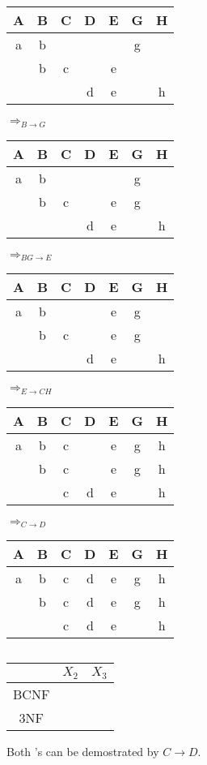 \subsection{}
\begin{center}
	\begin{tabular}{| c | c | c | c | c | c | c |}
		\hline
		A	&B	&C	&D	&E	&G	&H	\\\hline
		a	&b	&	&	&	&g	&	\\\hline
			&b	&c	&	&e	&	&	\\\hline
			&	&	&d	&e	&	&h	\\\hline
	\end{tabular}
	$\Longrightarrow_{B\rightarrow G}$
	\begin{tabular}{| c | c | c | c | c | c | c |}
		\hline
		A	&B	&C	&D	&E	&G	&H	\\\hline
		a	&b	&	&	&	&g	&	\\\hline
			&b	&c	&	&e	&g	&	\\\hline
			&	&	&d	&e	&	&h	\\\hline
	\end{tabular}
	$\Longrightarrow_{BG\rightarrow E}$
	\begin{tabular}{| c | c | c | c | c | c | c |}
		\hline
		A	&B	&C	&D	&E	&G	&H	\\\hline
		a	&b	&	&	&e	&g	&	\\\hline
			&b	&c	&	&e	&g	&	\\\hline
			&	&	&d	&e	&	&h	\\\hline
	\end{tabular}
	$\Longrightarrow_{E\rightarrow CH}$
	\begin{tabular}{| c | c | c | c | c | c | c |}
		\hline
		A	&B	&C	&D	&E	&G	&H	\\\hline
		a	&b	&c	&	&e	&g	&h	\\\hline
			&b	&c	&	&e	&g	&h	\\\hline
			&	&c	&d	&e	&	&h	\\\hline
	\end{tabular}
	$\Longrightarrow_{C\rightarrow D}$
	\begin{tabular}{| c | c | c | c | c | c | c |}
		\hline
		A	&B	&C	&D	&E	&G	&H	\\\hline
		a	&b	&c	&d	&e	&g	&h	\\\hline
			&b	&c	&d	&e	&g	&h	\\\hline
			&	&c	&d	&e	&	&h	\\\hline
	\end{tabular}
\end{center}

\subsection{}
\begin{center}
\begin{tabular}{| c | c | c |}
	\hline
			&$X_2$	&$X_3$	\\\hline
	BCNF	&\cmark	&\xmark	\\\hline
	3NF		&\cmark	&\xmark	\\\hline
\end{tabular}
\end{center}

Both \xmark 's can be demostrated by $C\rightarrow D$.\\
